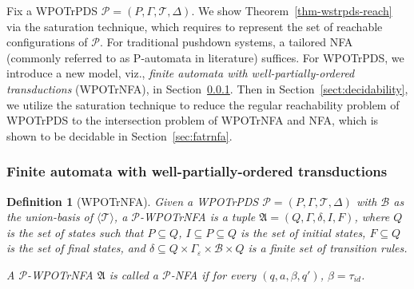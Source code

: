 \documentclass[preprint,12pt]{elsarticle}
\newtheorem{definition}{Definition}
\newcommand\Mm{{\mathcal{M} }}
\newcommand\Pp{{\mathcal{P} }}
\newcommand\act{{\sf Act}}
\newcommand\aft{{\sf Aft}}
\newcommand\lmd{{\sf Lmd}}
\newcommand{\AMASS}{\textsf{ASM}}
\newcommand\Aut{{\mathfrak{A} }}
\newcommand\TranSet{{\mathscr{T} }}
\newcommand\Tranbasis{{\mathscr{B} }}
\newcommand{\WOTrPDS}{\textsf{WPOTrPDS}}
\newcommand{\WOTrNFA}{\textsf{WPOTrNFA}}
\newcommand{\NFA}{\textsf{NFA}}
\begin{document}
Fix a  {\WOTrPDS} $\Pp = (P, \Gamma, \TranSet, \Delta)$. %
We show Theorem~\ref{thm-wstrpds-reach} via the saturation technique, which %
requires to represent the set of reachable configurations of $\Pp$. For traditional pushdown systems, a tailored {\NFA} (commonly referred to as P-automata in literature) suffices. For {\WOTrPDS}, we %
introduce a new model, viz., \emph{finite automata with well-partially-ordered transductions} ({\WOTrNFA}), in Section~\ref{sec-wotrnfa}. 
Then in Section~\ref{sect:decidability}, we utilize the saturation technique to reduce the regular reachability problem of {\WOTrPDS} %
to the intersection problem of {\WOTrNFA} and {\NFA}, which is shown to be decidable in Section~\ref{sec:fatrnfa}.



\subsubsection{Finite automata with well-partially-ordered transductions}\label{sec-wotrnfa}
 
\begin{definition}[{\WOTrNFA}] %
	Given a {\WOTrPDS} $\Pp=(P, \Gamma, \TranSet, \Delta)$ with $\Tranbasis$ as the union-basis of $\langle \TranSet \rangle$, a $\Pp$-{\WOTrNFA} is a tuple $\Aut =(Q, \Gamma, \delta, I, F)$,
	where $Q$ is the set of states such that $P \subseteq Q$, $I\subseteq P\subseteq Q$ is the set of initial states, $F \subseteq Q$ is the set of final states,  
	and $\delta \subseteq Q \times \Gamma_\varepsilon \times \Tranbasis \times Q$ is a finite set of transition rules.

    A $\Pp$-{\WOTrNFA} $\Aut$ is called a {$\Pp$-{\NFA}} if for every $(q, a, \beta, q')$, $\beta = \tau_{id}$. 
\end{definition}
\end{document}
